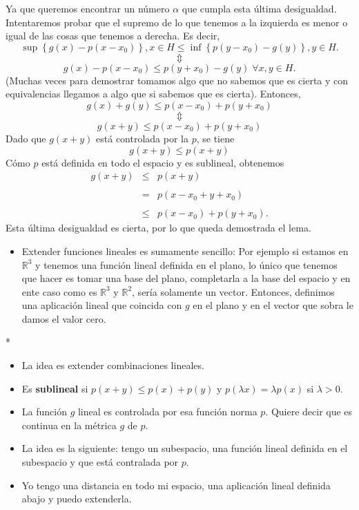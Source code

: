 \begin{paracol}{2}
\begin{lema}
	Ya que queremos encontrar un número $\alpha$ que cumpla esta última desigualdad. Intentaremos probar que el supremo de lo que tenemos a la izquierda es menor o igual de las cosas que tenemos a derecha. Es decir,
	$$\sup\left\{g(x)-p(x-x_0)\right\},x\in H\leq \inf\left\{p(y-x_0)-g(y)\right\},y\in H.$$
	$$\Updownarrow$$
	$$g(x)-p(x-x_0)\leq p(y+x_0)-g(y)\; \forall x,y\in H.$$
	(Muchas veces para demostrar tomamos algo que no sabemos que es cierta y con equivalencias llegamos a algo que si sabemos que es cierta). Entonces, 
	$$g(x)+g(y)\leq p(x-x_0)+p(y+x_0)$$
	$$\Updownarrow$$
	$$g(x+y)\leq p(x-x_0)+p(y+x_0)$$
	Dado que $g(x+y)$ está controlada por la $p$, se tiene
	$$g(x+y)\leq p(x+y)$$
	Cómo $p$ está definida en todo el espacio y es sublineal, obtenemos
	$$
	\begin{array}{rcl}
	    g(x+y)&\leq& p(x+y)\\\\
		  &=& p(x-x_0+y+x_0)\\\\
		  &\leq& p(x-x_0)+p(y+x_0).
	\end{array}
	$$
	Esta última desigualdad es cierta, por lo que queda demostrada el lema.
\end{lema}

\begin{itemize}
    \item Extender funciones lineales es sumamente sencillo: Por ejemplo si estamos en $\mathbb{R}^3$ y tenemos una función lineal definida en el plano, lo único que tenemos que hacer es tomar una base del plano, completarla a la base del espacio y en ente caso como es $\mathbb{R}^3$ y $\mathbb{R}^2$, sería solamente un vector. Entonces, definimos una aplicación lineal que coincida con $g$ en el plano y en el vector que sobra le damos el valor cero.
\end{itemize}

\switchcolumn[1]*{\noindent\scriptsize
\begin{itemize}
    \item La idea es extender combinaciones lineales.
    \item Es \textbf{sublineal} si $p(x+y)\leq p(x)+p(y)$ y $p(\lambda x)=\lambda p(x)$ si $\lambda>0$.
    \item La función $g$ lineal es controlada por esa función norma $p$. Quiere decir que es continua en la métrica $g$ de $p$. 
    \item La idea es la siguiente: tengo un subespacio, una función lineal definida en el subespacio y que está contralada por $p$.
    \item Yo tengo una distancia en todo mi espacio, una aplicación lineal definida abajo y puedo extenderla.
\end{itemize}
}


\end{paracol}

